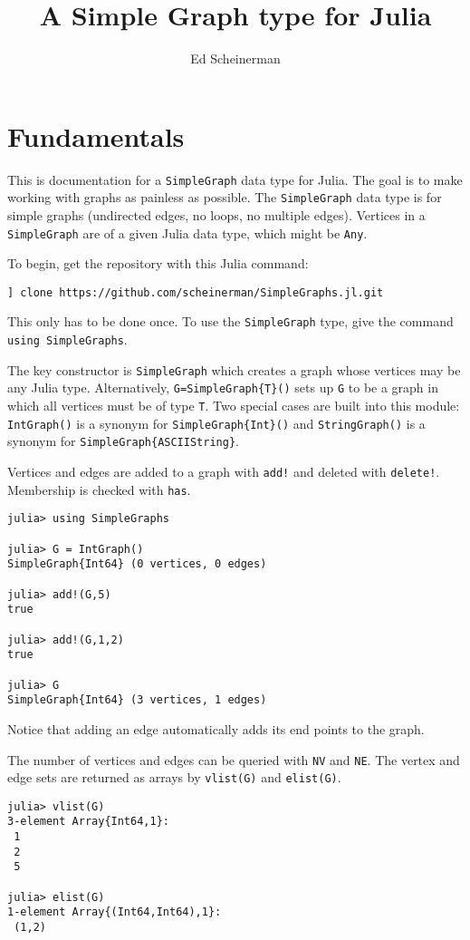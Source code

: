 \documentclass[oneside]{amsart}
\title{A Simple Graph type for Julia}
\author{Ed Scheinerman}
\begin{document}
\maketitle


\section{Fundamentals}

This is documentation for a \verb|SimpleGraph| data type for Julia. The
goal is to make working with graphs as painless as possible. The
\verb|SimpleGraph| data type is for simple graphs (undirected edges, no
loops, no multiple edges). Vertices in a \verb|SimpleGraph| are of a
given Julia data type, which might be \verb|Any|.

To begin, get the repository with this Julia command:
\begin{verbatim}
] clone https://github.com/scheinerman/SimpleGraphs.jl.git
\end{verbatim}
This only has to be done once. To use the \verb|SimpleGraph| type,
give the command \verb|using SimpleGraphs|.


The key constructor is
\verb|SimpleGraph| which creates a graph whose vertices may be any Julia
type. Alternatively, \verb|G=SimpleGraph{T}()| sets up \verb|G| to be a
graph in which all vertices must be of type \verb|T|. Two special
cases are built into this module: \verb|IntGraph()| is a synonym for
\verb|SimpleGraph{Int}()| and \verb|StringGraph()| is a synonym for
\verb|SimpleGraph{ASCIIString}|.

Vertices and edges are added to a graph with \verb|add!| and deleted
with \verb|delete!|. Membership is checked with \verb|has|.
\begin{verbatim}
julia> using SimpleGraphs

julia> G = IntGraph()
SimpleGraph{Int64} (0 vertices, 0 edges)

julia> add!(G,5)
true

julia> add!(G,1,2)
true

julia> G
SimpleGraph{Int64} (3 vertices, 1 edges)
\end{verbatim}
Notice that adding an edge automatically adds its end points to the
graph.

The number of vertices and edges can be queried with \verb|NV| and
\verb|NE|. The vertex and edge sets are returned as arrays by
\verb|vlist(G)| and \verb|elist(G)|.
\begin{verbatim}
julia> vlist(G)
3-element Array{Int64,1}:
 1
 2
 5

julia> elist(G)
1-element Array{(Int64,Int64),1}:
 (1,2)
\end{verbatim}
\end{document}
